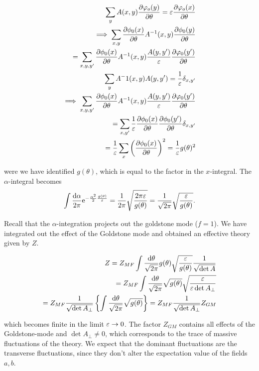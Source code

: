 \begin{align*}
    \sum_y A(x,y) \pdv{\varphi_o(y)}{\theta} = \varepsilon \pdv{\varphi_o(x)}{\theta} \\ 
    \implies \sum_{x,y} \pdv{\phi_0(x)}{\theta}A^{-1}(x,y)\pdv{\phi_0(y)}{\theta} \\ 
    = \sum_{x,y,y'} \pdv{\phi_0(x)}{\theta}A^{-1}(x,y) \frac{A(y,y')}{\varepsilon} \pdv{\varphi_0(y')}{\theta} \\ 
    \sum_y A^-1(x,y)A(y,y') = \frac{1}{\varepsilon}\delta_{x,y'} \\
    \implies \sum_{x,y,y'} \pdv{\phi_0(x)}{\theta}A^{-1}(x,y) \frac{A(y,y')}{\varepsilon} \pdv{\varphi_0(y')}{\theta} \\ 
    = \sum_{x,y'} \frac{1}{\varepsilon}\pdv{\phi_0(x)}{\theta}\pdv{\phi_0(y')}{\theta}\delta_{x,y'} \\
    = \frac{1}{\varepsilon}\sum_x \left(\pdv{\phi_0(x)}{\theta}\right)^2 = \frac{1}{\varepsilon} g(\theta)^2
\end{align*}

were we have identified $g(\theta)$, which is equal to the factor in the $x$-integral. The $\alpha$-integral becomes 
\begin{align*}
    \int \frac{\dd \alpha}{2\pi} \mathrm{e}^{-\frac{\alpha^2}{2}\frac{g(\theta)}{\varepsilon}} = \frac{1}{2\pi}\sqrt{\frac{2\pi \varepsilon}{g(\theta)}} =  \frac{1}{\sqrt{
    2\pi}}\sqrt{\frac{\varepsilon}{g(\theta)}}. 
\end{align*}

Recall that the $\alpha$-integration projects out the goldstone mode ($f = 1$). We have integrated out the effect of the Goldstone mode and obtained an effective theory given by $Z$. 

\begin{align*}
    Z = Z_{MF}\int \frac{\dd \theta}{\sqrt{2\pi}} g(\theta) \sqrt{\frac{\varepsilon}{g(\theta)}} \frac{1}{\sqrt{\det A}} \\
    = Z_{MF}\int \frac{\dd \theta}{\sqrt{2\pi}} \sqrt{
    g(\theta)} \sqrt{\frac{\varepsilon}{\varepsilon\det A_\perp}} \\ 
    = Z_{MF} \frac{1}{\sqrt{\det A_\perp}} \left\{ \int \frac{\dd \theta}{\sqrt{2\pi}}\sqrt{g(\theta)} \right\} = Z_{MF} \frac{1}{\sqrt{\det A_\perp}} Z_{GM}
\end{align*}

which becomes finite in the limit $\varepsilon \to 0$. The factor $Z_{GM}$ contains all effects of the Goldstone-mode and $\det A_\perp \neq 0$, which corresponds to the trace of massive fluctuations of the theory. We expect that the dominant fluctuations are the transverse fluctuations, since they don't alter the expectation value of the fields $a,b$. \\ 

